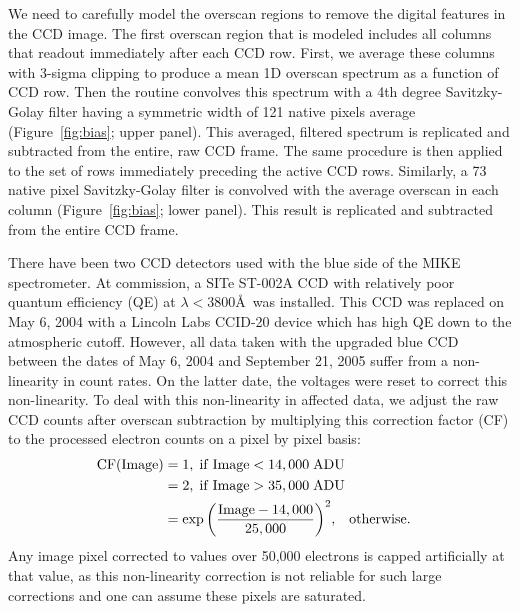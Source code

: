\documentclass[12pt,preprint]{aastex}
\begin{document}
We need to carefully model the overscan regions
to remove the digital features in the CCD image.  The first overscan
region that is modeled includes all columns that readout 
immediately after each CCD row.  First, we 
average these columns with 3-sigma clipping to produce a mean 1D 
overscan spectrum as a function of CCD row.
Then the routine convolves this spectrum with 
a 4th degree Savitzky-Golay filter having 
a symmetric width of 121 native pixels average 
(Figure~\ref{fig:bias}; upper panel). 
This averaged, filtered spectrum is replicated and subtracted from
the entire, raw CCD frame.  %
The same procedure is then applied to the set of rows 
immediately preceding the active CCD rows.  Similarly, a 73 native pixel 
Savitzky-Golay filter is convolved with the average overscan in each column
(Figure~\ref{fig:bias}; lower panel).
This result is replicated and subtracted from the entire CCD frame.

There have been two CCD detectors used with the blue side of
the MIKE spectrometer.  
At commission, a SITe ST-002A CCD with relatively poor quantum
efficiency (QE) at $\lambda < 3800$\AA\ was installed.  This CCD was
replaced on May 6, 2004 with a Lincoln Labs CCID-20 device which has
high QE down to the atmospheric cutoff.  However, all data taken with
the upgraded blue CCD between the dates of May 6, 2004 and September
21, 2005 suffer from a non-linearity in count rates.  On the latter
date, the voltages were reset to correct this non-linearity.  To deal
with this non-linearity in affected data, we adjust the raw CCD counts
after overscan subtraction by multiplying this correction factor (CF)
to the processed electron counts on a pixel by pixel basis:
\begin{eqnarray}
{\rm CF(Image)} &= 1, \; {\rm if \; Image} < 14,000 \;{\rm ADU} \\
                        &= 2, \; {\rm if \; Image} > 35,000 \;{\rm ADU} \nonumber\\
                        &= \exp{\left(\frac{{\rm Image}-14,000}{25,000}\right)^2}, 
                            \;\;\; {\rm otherwise.}\;\;\; \nonumber
\end{eqnarray}
Any image pixel corrected to values over 50,000 electrons is capped 
artificially at that value, as
this non-linearity correction is not reliable for such large corrections
and one can assume these pixels are saturated.
\end{document}
